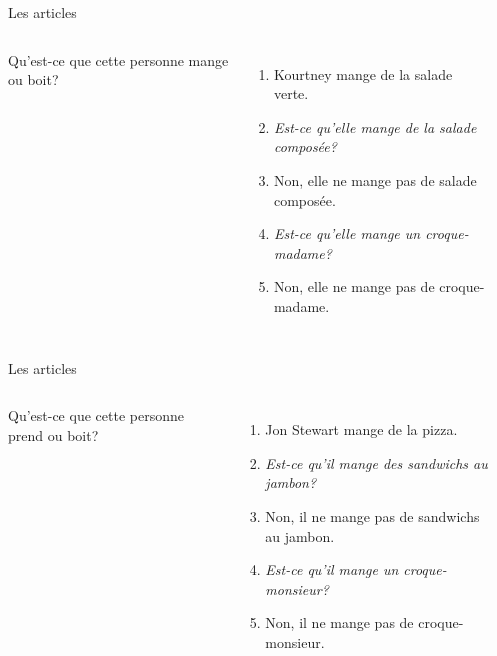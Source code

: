 \documentclass{beamer}
\begin{document}
  \begin{frame}{Les articles}
    \begin{columns}
        Qu'est-ce que cette personne mange ou boit?
        \begin{enumerate}
          \item<2-> Kourtney mange de la salade verte.
          \item<2-> \emph{Est-ce qu'elle mange de la salade composée?}
          \item<3-> Non, elle ne mange pas de salade composée.
          \item<3-> \emph{Est-ce qu'elle mange un croque-madame?}
          \item<4-> Non, elle ne mange pas de croque-madame.
        \end{enumerate}
        \begin{minipage}[c][0.6\textwidth]{\linewidth}
          \begin{center}
          \end{center}
        \end{minipage}
    \end{columns}
  \end{frame}

  \begin{frame}{Les articles}
    \begin{columns}
        Qu'est-ce que cette personne prend ou boit?
        \begin{enumerate}
          \item<2-> Jon Stewart mange de la pizza.
          \item<2-> \emph{Est-ce qu'il mange des sandwichs au jambon?}
          \item<3-> Non, il ne mange pas de sandwichs au jambon.
          \item<3-> \emph{Est-ce qu'il mange un croque-monsieur?}
          \item<4-> Non, il ne mange pas de croque-monsieur.
        \end{enumerate}
        \begin{minipage}[c][0.6\textwidth]{\linewidth}
          \begin{center}
          \end{center}
        \end{minipage}
    \end{columns}
  \end{frame}
\end{document}
